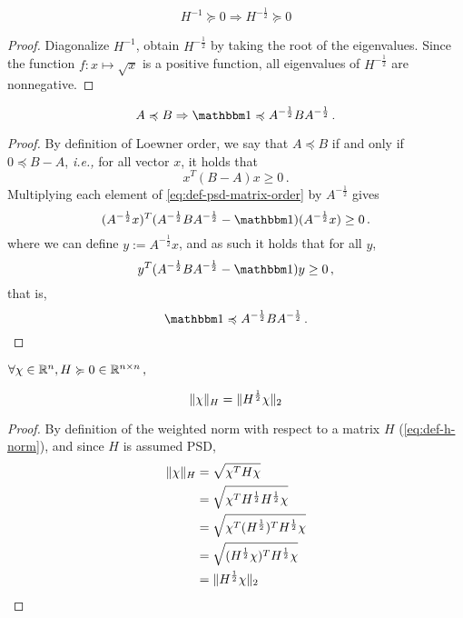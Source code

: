\begin{proposition}\label{prop:psd-root}
    $$H^{-1}  \succcurlyeq 0 \Rightarrow H^{-\frac{1}{2}} \succcurlyeq 0$$
\end{proposition}
\begin{proof}
    Diagonalize $H^{-1}$, obtain $H^{-\frac{1}{2}}$ by taking the root of the
    eigenvalues. Since the function $f : x \mapsto \sqrt x$ is a positive
    function, all eigenvalues of $H^{-\frac{1}{2}}$ are nonnegative.
\end{proof}

\begin{proposition}\label{prop:product-of-root-psd}
    $$A \preccurlyeq B \Rightarrow \mathbbm 1 \preccurlyeq A^{-\frac 1 2}BA^{-\frac 1 2} \, . $$
\end{proposition}
\begin{proof}
By definition of Loewner order, we say that $A \preccurlyeq B $ if and only if $
0 \preccurlyeq B - A$, \emph{i.e.,} for all vector $x$, it holds that
\begin{equation}\label{eq:def-psd-matrix-order}
    x^T(B-A)x \geq 0  \, .
\end{equation}
Multiplying each element of \autoref{eq:def-psd-matrix-order} by $A^{-\frac 1 2}$
gives
\begin{equation*}
    (A^{-\frac 1 2}x)^T(A^{-\frac 1 2}BA^{-\frac 1 2}-\mathbbm 1)(A^{-\frac 1 2}x) \geq 0 \, .
\end{equation*}
where we can define $y := A^{-\frac 1 2}x$, and as such it holds that for all $y$,
\begin{equation*}
    y^T(A^{-\frac 1 2}BA^{-\frac 1 2}-\mathbbm 1)y \geq 0 \, ,
\end{equation*}
that is,
\begin{equation*}
    \mathbbm 1  \preccurlyeq A^{-\frac 1 2}BA^{-\frac 1 2} \, .
\end{equation*}
\end{proof}
\begin{proposition}\label{prop:change-norm}
$\forall \chi \in \mathbb R^{n}, H\succcurlyeq 0 \in \mathbb R^{n\times n}\, ,$

$$\| \chi \|_H = \| H^{\frac{1}{2}}\chi\|_2 $$
\end{proposition}
\begin{proof}
    By definition of the weighted norm with respect to a matrix $H$
    (\autoref{eq:def-h-norm}), and since $H$ is assumed PSD,
    \begin{equation*}
        \begin{aligned}
            \| \chi \|_H & = \sqrt{\chi^T H \chi} \\
                & = \sqrt{\chi^T H^{\frac{1}{2}} H^{\frac{1}{2}} \chi} \\
                & = \sqrt{\chi^T (H^{\frac{1}{2}})^T H^{\frac{1}{2}} \chi} \\
                & = \sqrt{(H^{\frac{1}{2}}\chi)^T H^{\frac{1}{2}} \chi} \\
                & = \| H^{\frac{1}{2}} \chi \|_2
        \end{aligned}
    \end{equation*}

\end{proof}

